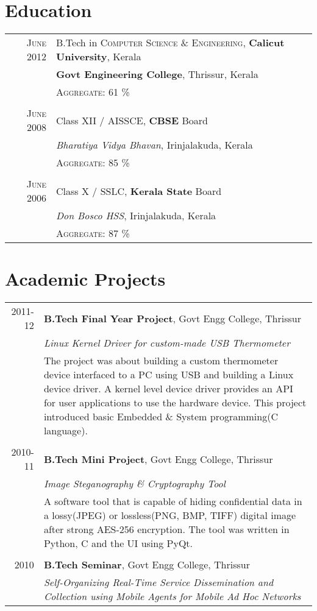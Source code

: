 \documentclass[a4paper,10pt]{article}
\begin{document}
\section{Education}
\begin{tabular}{rl}	
 \textsc{June} 2012 & B.Tech in \textsc{Computer Science \& Engineering}, \textbf{Calicut University}, Kerala\\
& \textbf{Govt Engineering College}, Thrissur, Kerala\\
& \textsc{Aggregate}: 61 \% \\&\\
 \textsc{June} 2008 & Class XII / \textsc{AISSCE}, \textbf{CBSE} Board\\
& \emph{Bharatiya Vidya Bhavan}, Irinjalakuda, Kerala\\
& \textsc{Aggregate}: 85 \% \\&\\
 \textsc{June} 2006 & Class X / \textsc{SSLC}, \textbf{Kerala State} Board\\
& \emph{Don Bosco HSS}, Irinjalakuda, Kerala\\
& \textsc{Aggregate}: 87 \%
\end{tabular}










\section{Academic Projects}
\begin{tabular}{r|p{11cm}}
\textsc{2011-12} & \textbf{B.Tech Final Year Project}, Govt Engg College, Thrissur \\&\emph{Linux Kernel Driver for custom-made USB Thermometer}\\&\footnotesize{The project was about building a custom thermometer device interfaced to a PC using USB and building a Linux device driver. A kernel level device driver provides an API for user applications to use the hardware device. This project introduced basic Embedded \& System programming(C language).}\\\multicolumn{2}{c}{} \\
\textsc{2010-11} & \textbf{B.Tech Mini Project}, Govt Engg College, Thrissur \\&\emph{Image Steganography \& Cryptography Tool}\\&\footnotesize{A software tool that is capable of hiding confidential data in a lossy(JPEG) or lossless(PNG, BMP, TIFF) digital image after strong AES-256 encryption. The tool was written in Python, C and the UI using PyQt.}\\\multicolumn{2}{c}{} \\
\textsc{2010} & \textbf{B.Tech Seminar}, Govt Engg College, Thrissur \\&\emph{Self-Organizing Real-Time Service Dissemination and Collection using Mobile
Agents for Mobile Ad Hoc Networks}
\end{tabular}
\end{document}
